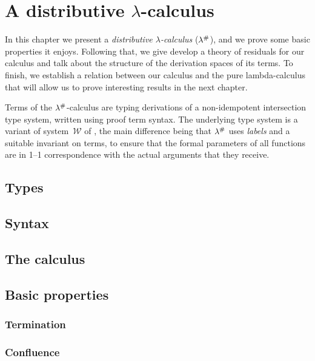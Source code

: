 \chapter{A distributive $\lambda$-calculus}

In this chapter we present a
{\em distributive $\lambda$-calculus} ($\lambda^{\mathtt{\#}}$),
and we prove some basic properties it enjoys.
Following that, we give develop a theory of residuals for our calculus and talk
about the structure of the derivation spaces of its terms.
To finish, we establish a relation between our calculus and the pure lambda-calculus
that will allow us to prove interesting results in the next chapter.

Terms of the $\lambda^{\mathtt{\#}}$-calculus are typing derivations of a non-idempotent intersection type
system, written using proof term syntax.
The underlying type system is a variant of
system~$\mathcal{W}$ of \cite{bucciarelli2014inhabitation,bucciarelli2017non},
the main difference being that $\lambda^{\mathtt{\#}}$
uses {\em labels} and a suitable invariant on terms,
to ensure that the formal parameters of all functions
are in 1--1 correspondence with the actual arguments that they receive.

\section{Types}


\section{Syntax}


\section{The calculus}


\section{Basic properties}


\subsection{Termination}


\subsection{Confluence}


